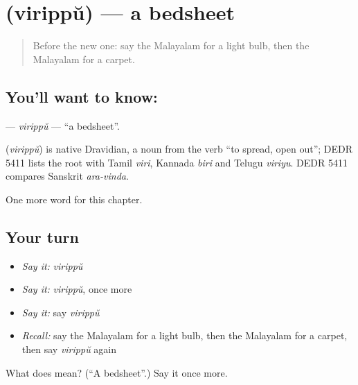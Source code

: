 \section[\texorpdfstring{\ml{വിരിപ്പ്} (virippŭ)}{വിരിപ്പ് (virippŭ)}]{ (virippŭ) — a bedsheet}

\label{lesson:ML-C296-virippu}



\begin{quote}
Before the new one: say the Malayalam for a light bulb, then the Malayalam for a carpet.
\end{quote}

\subsection*{You'll want to know: }
\textbf{} — \emph{virippŭ} — \textquotedblleft{}a bedsheet\textquotedblright{}.

\begin{cousinweb}
\textbf{} (\emph{virippŭ}) is native Dravidian, a noun from the verb \textquotedblleft{}to spread, open out\textquotedblright{}; DEDR 5411 lists the root with Tamil \emph{viri}, Kannada \emph{biri} and Telugu \emph{viriyu}. DEDR 5411 compares Sanskrit \emph{ara-vinda}.
\end{cousinweb}

\begin{grammarlens}[title={What you've built}]
One more word for this chapter.
\end{grammarlens}

\subsection*{Your turn}
\begin{itemize}
\raggedright
  \item \emph{Say it:} \emph{virippŭ}
  \item \emph{Say it:} \emph{virippŭ}, once more
  \item \emph{Say it:} say \emph{virippŭ}
  \item \emph{Recall:} say the Malayalam for a light bulb, then the Malayalam for a carpet, then say \emph{virippŭ} again
\end{itemize}

\begin{tcolorbox}[breakable,colback=teal!4,colframe=teal!35!black,title={Before you move on}]
What does  mean? (\textquotedblleft{}A bedsheet\textquotedblright{}.) Say it once more.
\end{tcolorbox}
